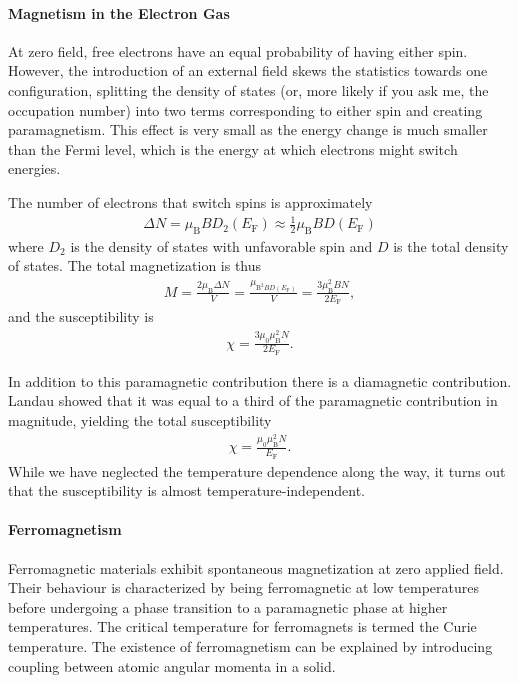 \paragraph{Magnetism in the Electron Gas}
At zero field, free electrons have an equal probability of having either spin. However, the introduction of an external field skews the statistics towards one configuration, splitting the density of states (or, more likely if you ask me, the occupation number) into two terms corresponding to either spin and creating paramagnetism. This effect is very small as the energy change is much smaller than the Fermi level, which is the energy at which electrons might switch energies.

The number of electrons that switch spins is approximately
\begin{align*}
	\Delta N = \mu_{\text{B}}BD_{2}(E_{\text{F}}) \approx \frac{1}{2}\mu_{\text{B}}BD(E_{\text{F}})
\end{align*}
where $D_{2}$ is the density of states with unfavorable spin and $D$ is the total density of states. The total magnetization is thus
\begin{align*}
	M = \frac{2\mu_{\text{B}}\Delta N}{V} = \frac{\mu_{\text{B}^{2}BD(E_{\text{F}})}}{V} = \frac{3\mu_{\text{B}}^{2}BN}{2E_{\text{F}}},
\end{align*}
and the susceptibility is
\begin{align*}
	\chi = \frac{3\mu_{0}\mu_{\text{B}}^{2}N}{2E_{\text{F}}}.
\end{align*}

In addition to this paramagnetic contribution there is a diamagnetic contribution. Landau showed that it was equal to a third of the paramagnetic contribution in magnitude, yielding the total susceptibility
\begin{align*}
	\chi = \frac{\mu_{0}\mu_{\text{B}}^{2}N}{E_{\text{F}}}.
\end{align*}
While we have neglected the temperature dependence along the way, it turns out that the susceptibility is almost temperature-independent.

\paragraph{Ferromagnetism}
Ferromagnetic materials exhibit spontaneous magnetization at zero applied field. Their behaviour is characterized by being ferromagnetic at low temperatures before undergoing a phase transition to a paramagnetic phase at higher temperatures. The critical temperature for ferromagnets is termed the Curie temperature. The existence of ferromagnetism can be explained by introducing coupling between atomic angular momenta in a solid.

